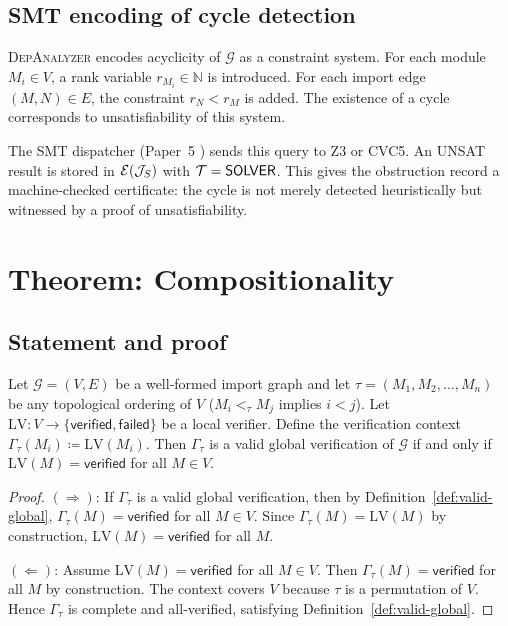 \documentclass[11pt]{article}
\newcommand{\IG}{\mathcal{G}}              %
\newcommand{\DA}{\textsc{DepAnalyzer}}     %
\newcommand{\TopoOrd}{\tau}                %
\newcommand{\LocalVerif}{\mathrm{LV}}      %
\newcommand{\VerifCtx}{\Gamma}             %
\newcommand{\NN}{\mathbb{N}}
\begin{document}
\subsection{SMT encoding of cycle detection}

\DA{} encodes acyclicity of $\IG$ as a \QFLIA{} constraint system.
For each module $M_i \in V$, a rank variable $r_{M_i} \in \NN$ is
introduced.  For each import edge $(M, N) \in E$, the constraint
$r_N < r_M$ is added.  The existence of a cycle corresponds to
unsatisfiability of this system.

The \JuGeo{} SMT dispatcher (Paper~5 \cite{paper05}) sends this query
to Z3 or CVC5.  An \textsf{UNSAT} result is stored in
$\mathcal{E}(\mathcal{J}_S)$ with $\mathcal{T} = \mathsf{SOLVER}$.  This gives the obstruction
record a machine-checked certificate: the cycle is not merely
detected heuristically but witnessed by a proof of unsatisfiability.

\section{Theorem: Compositionality}
\label{sec:theorem}

\subsection{Statement and proof}

\begin{theorem}[Compositionality]
\label{thm:compositionality}
Let $\IG = (V, E)$ be a well-formed import graph and let
$\TopoOrd = (M_1, M_2, \ldots, M_n)$ be any topological ordering of
$V$ (\ie $M_i <_{\TopoOrd} M_j$ implies $i < j$).
Let $\LocalVerif \colon V \to \{\mathsf{verified}, \mathsf{failed}\}$
be a local verifier.
Define the verification context
$\VerifCtx_{\TopoOrd}(M_i) \coloneqq \LocalVerif(M_i)$.
Then $\VerifCtx_{\TopoOrd}$ is a valid global verification of $\IG$
if and only if $\LocalVerif(M) = \mathsf{verified}$ for all $M \in V$.
\end{theorem}

\begin{proof}
$(\Rightarrow)$: If $\VerifCtx_{\TopoOrd}$ is a valid global
verification, then by Definition~\ref{def:valid-global},
$\VerifCtx_{\TopoOrd}(M) = \mathsf{verified}$ for all $M \in V$.
Since $\VerifCtx_{\TopoOrd}(M) = \LocalVerif(M)$ by construction,
$\LocalVerif(M) = \mathsf{verified}$ for all $M$.

$(\Leftarrow)$: Assume $\LocalVerif(M) = \mathsf{verified}$ for all
$M \in V$.  Then $\VerifCtx_{\TopoOrd}(M) = \mathsf{verified}$ for
all $M$ by construction.  The context covers $V$ because $\TopoOrd$
is a permutation of $V$.  Hence $\VerifCtx_{\TopoOrd}$ is complete and
all-verified, satisfying Definition~\ref{def:valid-global}.
\end{proof}
\end{document}
